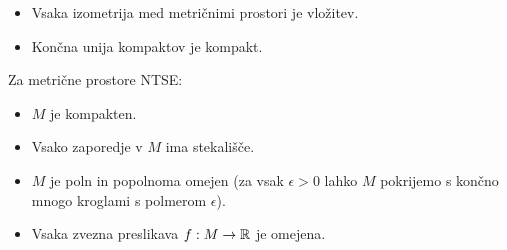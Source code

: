 \begin{itemize} 
    \item Vsaka izometrija med metričnimi prostori je vložitev.
    \item Končna unija kompaktov je kompakt.
\end{itemize}

\begin{izrek}
    Za metrične prostore NTSE:
    \begin{itemize}
        \item $M$ je kompakten.
        \item Vsako zaporedje v $M$ ima stekališče.
        \item $M$ je poln in popolnoma omejen (za vsak \(\epsilon > 0\) lahko $M$ pokrijemo s končno mnogo kroglami s polmerom \(\epsilon\)). 
        \item Vsaka zvezna preslikava $f: M \to \mathbb{R}$ je omejena.
    \end{itemize}
\end{izrek}